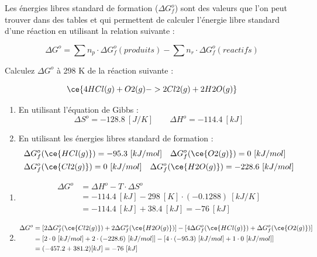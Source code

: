 \documentclass[
  11pt,
  french,
  a4paper,
  openany]{book}
\providecommand{\tightlist}{%
  \setlength{\itemsep}{0pt}\setlength{\parskip}{0pt}}
\begin{document}
\clearpage

Les énergies libres standard de formation (\(\Delta G^o_f\)) sont des valeurs que l'on peut trouver dans des tables et qui permettent de calculer l'énergie libre standard d'une réaction en utilisant la relation suivante :

\[
\Delta G^o = \sum n_p \cdot \Delta G^{o}_f(produits) - \sum n_r \cdot \Delta G^{o}_f(reactifs)
\]

\begin{Exercise}

Calculez \(\Delta G^o\) à 298 K de la réaction suivante :

\[ \ce{4 HCl(g) + O2(g) -> 2 Cl2(g) + 2 H2O(g)} \]

\begin{enumerate}
\def\labelenumi{\alph{enumi}.}
\tightlist
\item
  En utilisant l'équation de Gibbs :
  \[
  \Delta S^o = -128.8\ [J/K] \qquad \Delta H^o = -114.4\ [kJ]
  \]
\item
  En utilisant les énergies libres standard de formation :
  \[
  \begin{split}
  & \Delta G^o_f(\ce{HCl(g)}) = -95.3\ [kJ/mol] \quad \Delta G^o_f(\ce{O2(g)}) = 0\ [kJ/mol] \\
  & \Delta G^o_f(\ce{Cl2(g)}) = 0\ [kJ/mol] \quad \Delta G^o_f(\ce{H2O(g)}) = -228.6\ [kJ/mol]
  \end{split}
  \]
\end{enumerate}


\end{Exercise}

\begin{Answer}

\begin{enumerate}
\def\labelenumi{\alph{enumi}.}
\tightlist
\item
  \[
  \begin{split}
  \Delta G^o &= \Delta H^o - T \cdot \Delta S^o \\
   &= -114.4\ [kJ] - 298\ [K] \cdot (-0.1288)\ [kJ/K] \\
   &= -114.4\ [kJ] + 38.4\ [kJ] = -76\ [kJ]
  \end{split}
  \]
\item
  \[
  \begin{split}
  \Delta G^o &= [2 \Delta G^o_f(\ce{Cl2(g)}) + 2 \Delta G^o_f(\ce{H2O(g)})] - [4 \Delta G^o_f(\ce{HCl(g)}) + \Delta G^o_f(\ce{O2(g)})] \\
   &= [2 \cdot 0\ [kJ/mol] + 2 \cdot (-228.6)\ [kJ/mol]] - [4 \cdot (-95.3)\ [kJ/mol] + 1 \cdot 0\ [kJ/mol]] \\
   &= (-457.2 + 381.2) [kJ] = -76\ [kJ]
  \end{split}
  \]
\end{enumerate}


\end{Answer}
\end{document}
